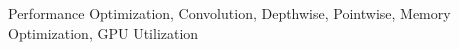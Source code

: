 \begin{abstract}
%
%
\end{abstract}


\begin{IEEEkeywords}
Performance Optimization, Convolution, Depthwise, Pointwise, Memory Optimization, GPU Utilization
\end{IEEEkeywords}

